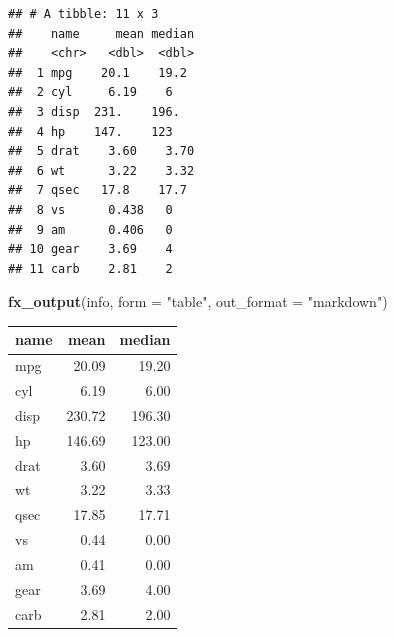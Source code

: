 \documentclass[]{report}
\newenvironment{Shaded}{\begin{snugshade}}{\end{snugshade}}
\newcommand{\KeywordTok}[1]{\textcolor[rgb]{0.13,0.29,0.53}{\textbf{#1}}}
\newcommand{\DataTypeTok}[1]{\textcolor[rgb]{0.13,0.29,0.53}{#1}}
\newcommand{\DecValTok}[1]{\textcolor[rgb]{0.00,0.00,0.81}{#1}}
\newcommand{\StringTok}[1]{\textcolor[rgb]{0.31,0.60,0.02}{#1}}
\newcommand{\ControlFlowTok}[1]{\textcolor[rgb]{0.13,0.29,0.53}{\textbf{#1}}}
\newcommand{\OperatorTok}[1]{\textcolor[rgb]{0.81,0.36,0.00}{\textbf{#1}}}
\newcommand{\NormalTok}[1]{#1}
\theoremstyle{definition}
\theoremstyle{definition}
\theoremstyle{definition}
\theoremstyle{remark}
\begin{document}
\begin{Shaded}
\end{Shaded}

\begin{verbatim}
## # A tibble: 11 x 3
##    name     mean median
##    <chr>   <dbl>  <dbl>
##  1 mpg    20.1    19.2 
##  2 cyl     6.19    6   
##  3 disp  231.    196.  
##  4 hp    147.    123   
##  5 drat    3.60    3.70
##  6 wt      3.22    3.32
##  7 qsec   17.8    17.7 
##  8 vs      0.438   0   
##  9 am      0.406   0   
## 10 gear    3.69    4   
## 11 carb    2.81    2
\end{verbatim}

\begin{Shaded}
\begin{Highlighting}[]
\KeywordTok{fx_output}\NormalTok{(info, }\DataTypeTok{form =} \StringTok{"table"}\NormalTok{, }\DataTypeTok{out_format =} \StringTok{"markdown"}\NormalTok{)}
\end{Highlighting}
\end{Shaded}

\begin{longtable}[]{@{}lrr@{}}
\toprule
name & mean & median\tabularnewline
\midrule
\endhead
mpg & 20.09 & 19.20\tabularnewline
cyl & 6.19 & 6.00\tabularnewline
disp & 230.72 & 196.30\tabularnewline
hp & 146.69 & 123.00\tabularnewline
drat & 3.60 & 3.69\tabularnewline
wt & 3.22 & 3.33\tabularnewline
qsec & 17.85 & 17.71\tabularnewline
vs & 0.44 & 0.00\tabularnewline
am & 0.41 & 0.00\tabularnewline
gear & 3.69 & 4.00\tabularnewline
carb & 2.81 & 2.00\tabularnewline
\bottomrule
\end{longtable}
\end{document}
